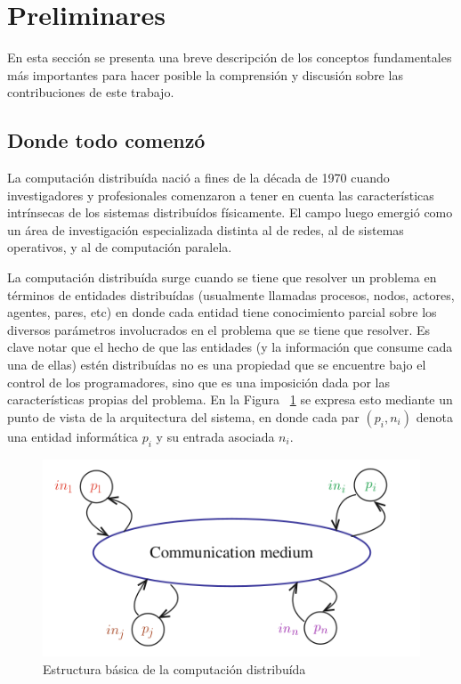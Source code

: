 \section{Preliminares}\label{sec:prelim}

En esta sección se presenta una breve descripción de los conceptos fundamentales
más importantes para hacer posible la comprensión y discusión sobre las
contribuciones de este trabajo.

\subsection{Donde todo comenzó}

La computación distribuída nació a fines de la década de 1970 cuando investigadores y profesionales
comenzaron a tener en cuenta las características intrínsecas de los sistemas distribuídos físicamente.
El campo luego emergió como un área de investigación especializada distinta al de redes, al de sistemas
operativos, y al de computación paralela.

La computación distribuída surge cuando se tiene que resolver un problema en términos de entidades
distribuídas (usualmente llamadas procesos, nodos, actores, agentes, pares, etc) en donde cada
entidad tiene conocimiento parcial sobre los diversos parámetros involucrados en el problema que
se tiene que resolver. 
Es clave notar que el hecho de que las entidades (y la información que consume cada una de ellas)
estén distribuídas no es una propiedad que se encuentre bajo el control de los programadores, sino 
que es una imposición dada por las características propias del problema. En la 
Figura ~\ref{fig:distributed-systems} se expresa esto mediante un punto de vista
de la arquitectura del sistema, en donde cada par $(p_i, n_i)$ denota una entidad informática $p_i$ y su
entrada asociada $n_i$.

\begin{figure}
  \centering
  \includegraphics[scale=0.5]{figures/distributed-systems.png}
  \caption{Estructura básica de la computación distribuída}
  \label{fig:distributed-systems}
\end{figure}


